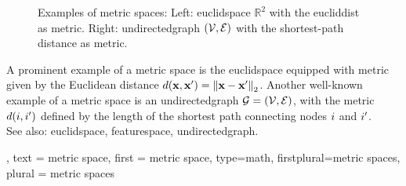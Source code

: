 {{\begin{figure}[H]
		\caption{Examples of metric spaces: Left: \gls{euclidspace} $\mathbb{R}^2$ with 
		the \gls{eucliddist} as metric. Right: \gls{undirectedgraph} $\left( \mathcal{V},\mathcal{E} \right)$ with 
		the shortest-path distance as metric.\label{fig:metric_space_examples_dict}}
	     \end{figure}
		A prominent example of a metric space 
		is the \gls{euclidspace} equipped with metric given by the Euclidean distance 
		$d({\bf x},{\bf x}') = \left\Vert {{\bf x}- {\bf x}'} \right\Vert_{2}$. 
		Another well-known example of a metric space is an \gls{undirectedgraph}  
        $\mathcal{G}=\left( \mathcal{V},\mathcal{E} \right)$, with the metric $d(i,i')$ 
		defined by the length of the shortest path connecting nodes $i$ and $i'$. 
			\\
		See also: \gls{euclidspace}, \gls{featurespace}, \gls{undirectedgraph}. },
    text = {metric space}, 
	first = {metric space}, 
	type=math, 
	firstplural={metric spaces}, 
	plural = {metric spaces}
}

